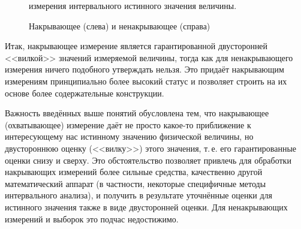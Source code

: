 \documentclass[a5paper,openany]{book}
\newcommand{\mbb}{\mathbb}
\begin{document}
\begin{figure}[!ht]
\centering\small 
\unitlength=1mm
\caption{Накрывающее (слева) и ненакрывающее (справа)} 
измерения интервального истинного значения величины. 
\label{ICoverMeasurPic} 
\end{figure} 
  
     
Итак, накрывающее измерение является гарантированной двусторонней <<вилкой>> значений 
измеряемой величины, тогда как для ненакрывающего измерения ничего подобного утверждать 
нельзя. Это придаёт накрывающим измерениям принципиально более высокий статус и 
позволяет строить на их основе более содержательные конструкции. 
      
Важность введённых выше понятий обусловлена тем, что накрывающее (охватывающее) измерение 
даёт не просто какое-то приближение к интересующему нас истинному значению физической 
величины, но двустороннюю оценку (<<вилку>>) этого значения, т.\,е. его гарантированные  
оценки снизу и сверху. Это обстоятельство позволяет привлечь для обработки накрывающих 
измерений более сильные средства, качественно другой математический аппарат (в частности, 
некоторые специфичные методы интервального анализа), и получить в результате уточнённые 
оценки для истинного значения также в виде двусторонней оценки. Для ненакрывающих 
измерений и выборок это подчас недостижимо. 
  
\end{document}
